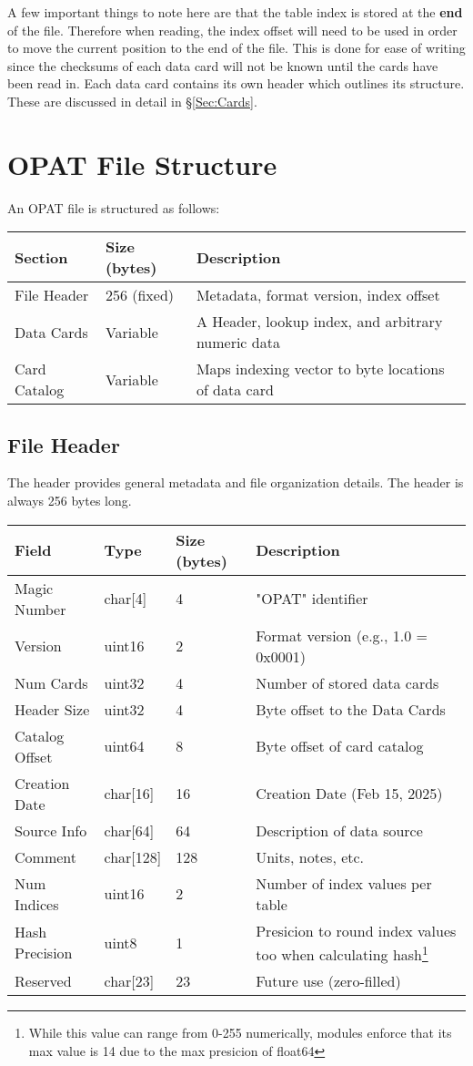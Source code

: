 \documentclass{article}
\begin{document}
\noindent A few important things to note here are that the table index is
stored at the \textbf{end} of the file.  Therefore when reading, the index
offset will need to be used in order to move the current position to the end of
the file.  This is done for ease of writing since the checksums of each data
card will not be known until the cards have been read in.  Each data card contains
its own header which outlines its structure.  These are discussed in detail in
\S \ref{Sec:Cards}. 

\section{OPAT File Structure}
An OPAT file is structured as follows:

\begin{center}
\begin{tabular}{|l|l|l|}
\hline
\textbf{Section} & \textbf{Size (bytes)} & \textbf{Description} \\
\hline
File Header & 256 (fixed) & Metadata, format version, index offset \\
Data Cards & Variable & A Header, lookup index, and arbitrary numeric data \\
Card Catalog & Variable & Maps indexing vector to byte locations of data card\\
\hline
\end{tabular}
\end{center}

\subsection{File Header}
The header provides general metadata and file organization details. The header is always 256 bytes long.
\begin{longtable}{|l|l|l|l|}
\hline
\textbf{Field} & \textbf{Type} & \textbf{Size (bytes)} & \textbf{Description} \\
\hline
Magic Number & char[4] & 4 & "OPAT" identifier \\
Version & uint16 & 2 & Format version (e.g., 1.0 = 0x0001) \\
Num Cards & uint32 & 4 & Number of stored data cards \\
Header Size & uint32 & 4 & Byte offset to the Data Cards \\
Catalog Offset & uint64 & 8 & Byte offset of card catalog \\
Creation Date & char[16] & 16 & Creation Date (Feb 15, 2025) \\
Source Info & char[64] & 64 & Description of data source \\
Comment & char[128] & 128 & Units, notes, etc. \\
Num Indices & uint16 & 2 & Number of index values per table \\
  Hash Precision & uint8 & 1 & Presicion to round index values too when calculating hash\footnote{While this value can range from 0-255 numerically, modules enforce that its max value is 14 due to the max presicion of float64} \\
Reserved & char[23] & 23 & Future use (zero-filled) \\
\hline
\end{longtable} 
\end{document}
